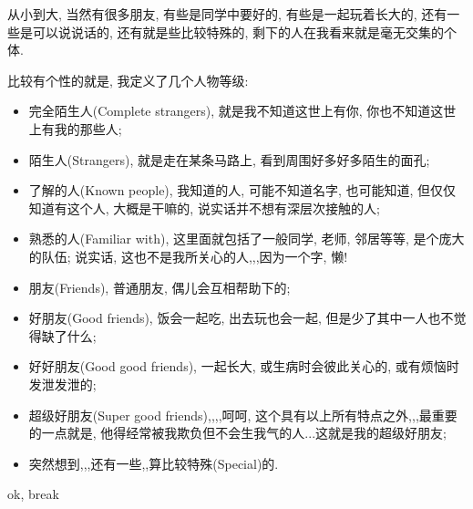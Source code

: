 \documentclass[letterpaper,10pt,english]{manual}
\begin{document}
从小到大, 当然有很多朋友, 有些是同学中要好的, 有些是一起玩着长大的, 还有一些是可以说说话的, 还有就是些比较特殊的, 剩下的人在我看来就是毫无交集的个体.

比较有个性的就是, 我定义了几个人物等级:
\begin{itemize}
\item {} 
完全陌生人(Complete strangers), 就是我不知道这世上有你, 你也不知道这世上有我的那些人;

\item {} 
陌生人(Strangers), 就是走在某条马路上, 看到周围好多好多陌生的面孔;

\item {} 
了解的人(Known people), 我知道的人, 可能不知道名字, 也可能知道, 但仅仅知道有这个人, 大概是干嘛的, 说实话并不想有深层次接触的人;

\item {} 
熟悉的人(Familiar with), 这里面就包括了一般同学, 老师, 邻居等等, 是个庞大的队伍; 说实话, 这也不是我所关心的人,,,因为一个字, 懒!

\item {} 
朋友(Friends), 普通朋友, 偶儿会互相帮助下的;

\item {} 
好朋友(Good friends), 饭会一起吃, 出去玩也会一起, 但是少了其中一人也不觉得缺了什么;

\item {} 
好好朋友(Good good friends), 一起长大, 或生病时会彼此关心的, 或有烦恼时发泄发泄的;

\item {} 
超级好朋友(Super good friends),,,,呵呵, 这个具有以上所有特点之外,,,最重要的一点就是, 他得经常被我欺负但不会生我气的人...这就是我的超级好朋友;

\item {} 
突然想到,,,还有一些,,算比较特殊(Special)的.

\end{itemize}

ok, break
\end{document}
